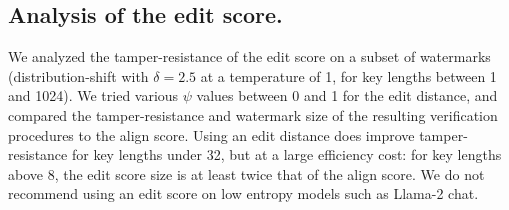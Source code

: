 \subsection{Analysis of the edit score.} 
\label{ssec:editscore}
We analyzed the tamper-resistance of the edit score on a subset of watermarks 
(distribution-shift with $\delta=2.5$ at a temperature of 1, for key lengths between 1 and 1024). 
We tried various $\psi$ values between 0 and 1 for the edit distance, and compared the tamper-resistance 
and watermark size of the resulting verification procedures to the align score. 
Using an edit distance does improve tamper-resistance for key lengths under 32, but at a large efficiency cost: 
for key lengths above 8, the edit score size is at least twice that of the align score. 
We do not recommend using an edit score on low entropy models such as Llama-2 chat.


